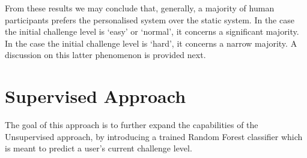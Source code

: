 \documentclass[letterpaper]{article}
\begin{document}
From these results we may conclude that, generally, a majority of human participants prefers the personalised system over the static system. In the case the initial challenge level is `easy' or `normal', it concerns a significant majority. In the case the initial challenge level is `hard', it concerns a narrow majority. A discussion on this latter phenomenon is provided next.



%




\section{Supervised Approach}
The goal of this approach is to further expand the capabilities of the Unsupervised approach, by introducing a trained Random Forest classifier which is meant to predict a user's current challenge level. 
\end{document}
